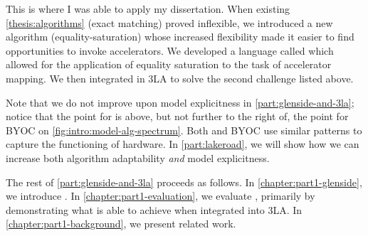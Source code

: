 This is where I was able to apply
  my dissertation.
When existing \cref{thesis:algorithms}
  (exact matching)
  proved inflexible,
  we introduced a new algorithm
  (\gls{equality-saturation})
  whose increased flexibility
  made it easier to find opportunities
  to invoke accelerators.
We developed a language
  called \g
  which allowed for the application
  of equality saturation
  to the task of accelerator mapping.
We then integrated \g in 3LA
  to solve the second challenge listed above.

Note that we do not improve upon
  model explicitness
  in \cref{part:glenside-and-3la};
  notice that the point for \g
  is above, but not further to the right of,
  the point for BYOC
  on \cref{fig:intro:model-alg-spectrum}.
Both \g and BYOC use similar patterns
  to capture the functioning of hardware.
In \cref{part:lakeroad},
  we will show how we can increase
  both algorithm adaptability
  \textit{and}
  model explicitness.


The rest of \cref{part:glenside-and-3la}
  proceeds as follows.
In \cref{chapter:part1-glenside},
  we introduce \g.
In \cref{chapter:part1-evaluation},
  we evaluate \g,
  primarily by demonstrating what
  \g is able to achieve
  when integrated into 3LA.
In \cref{chapter:part1-background},
  we present related work.




  



  
